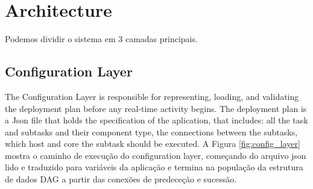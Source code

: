 \chapter{Architecture}
\label{chap:arch}
\thispagestyle{fancy}
\pagestyle{fancy}

Podemos dividir o sistema em 3 camadas principais. 


\section{Configuration Layer}
The Configuration Layer is responsible for representing, loading, and validating the deployment plan before any real-time activity begins. The deployment plan is a Json file that holds the specification of the aplication, that includes: all the task and subtasks and their component type, the connections between the subtasks, which host and core the subtask should be executed.
A Figura \ref{fig:config_layer} mostra o caminho de execução do configuration layer, começando do arquivo json lido e traduzido para variáveis da aplicação e termina na população da estrutura de dados DAG a partir das conexões de predeceção e sucessão.


